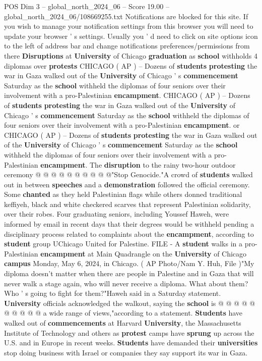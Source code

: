 \begin{textsample}{POS Dim 3 – global\_north\_2024\_06 – Score 19.00 – global\_north\_2024\_06/108669255.txt}  \label{ex:f3_pos_079}
Notifications are blocked for this site.
If you wish to manage your notification settings from this browser you will need to update your browser ' s settings.
Usually you ' d need to click on site options icon to the left of address bar and change notifications preferences/permissions from there \textbf{Disruptions} at \textbf{University} of Chicago \textbf{graduation} as \textbf{school} withholds 4 diplomas over \textbf{protests} CHICAGO ( AP ) -- Dozens of \textbf{students} \textbf{protesting} the war in Gaza walked out of the \textbf{University} of Chicago ' s \textbf{commencement} Saturday as the \textbf{school} withheld the diplomas of four seniors over their involvement with a pro-Palestinian \textbf{encampment}.
CHICAGO ( AP ) -- Dozens of \textbf{students} \textbf{protesting} the war in Gaza walked out of the \textbf{University} of Chicago ' s \textbf{commencement} Saturday as the \textbf{school} withheld the diplomas of four seniors over their involvement with a pro-Palestinian \textbf{encampment}. or CHICAGO ( AP ) -- Dozens of \textbf{students} \textbf{protesting} the war in Gaza walked out of the \textbf{University} of Chicago ' s \textbf{commencement} Saturday as the \textbf{school} withheld the diplomas of four seniors over their involvement with a pro-Palestinian \textbf{encampment}.
The \textbf{disruption} to the rainy two-hour outdoor ceremony @ @ @ @ @ @ @ @ @ @"Stop Genocide."A crowd of \textbf{students} walked out in between \textbf{speeches} and a \textbf{demonstration} followed the official ceremony.
Some \textbf{chanted} as they held Palestinian flags while others donned traditional keffiyeh, black and white checkered scarves that represent Palestinian solidarity, over their robes.
Four graduating seniors, including Youssef Haweh, were informed by email in recent days that their degrees would be withheld pending a disciplinary process related to complaints about the \textbf{encampment}, according to \textbf{student} group UChicago United for Palestine.
FILE - A \textbf{student} walks in a pro-Palestinian \textbf{encampment} at Main Quadrangle on the \textbf{University} of Chicago \textbf{campus} Monday, May 6, 2024, in Chicago. ( AP Photo/Nam Y.
Huh, File )"My diploma doesn't matter when there are people in Palestine and in Gaza that will never walk a stage again, who will never receive a diploma.
What about them?
Who ' s going to fight for them?"Haweh said in a Saturday statement. \textbf{University} officials acknowledged the walkout, saying the \textbf{school} is @ @ @ @ @ @ @ @ @ @ a wide range of views,"according to a statement. \textbf{Students} have walked out of \textbf{commencements} at Harvard \textbf{University}, the Massachusetts Institute of Technology and others as \textbf{protest} camps have \textbf{sprung} up across the U.S. and in Europe in recent weeks. \textbf{Students} have demanded their \textbf{universities} stop doing business with Israel or companies they say support its war in Gaza.

\end{textsample}
